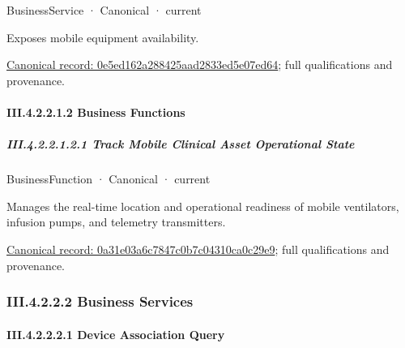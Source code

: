 \label{element:0e5ed162a288425aad2833ed5e07ed64}
{\small BusinessService · Canonical · current}\par

Exposes mobile equipment availability.


{\footnotesize \href{../../../../../../../continuum/business/business-service/0e5ed162a288425aad2833ed5e07ed64.md}{Canonical record: 0e5ed162a288425aad2833ed5e07ed64}; full qualifications and provenance.}\par
\paragraph*{III.4.2.2.1.2 Business Functions}
\label{navigation:III.4.2.2.1.2}

\subparagraph*{III.4.2.2.1.2.1 Track Mobile Clinical Asset Operational State}
\label{navigation:III.4.2.2.1.2.1}

\label{element:0a31e03a6c7847c0b7c04310ca0c29e9}
{\small BusinessFunction · Canonical · current}\par

Manages the real-time location and operational readiness of mobile ventilators, infusion pumps, and telemetry transmitters.


{\footnotesize \href{../../../../../../../continuum/business/business-function/0a31e03a6c7847c0b7c04310ca0c29e9.md}{Canonical record: 0a31e03a6c7847c0b7c04310ca0c29e9}; full qualifications and provenance.}\par
\subsubsection*{III.4.2.2.2 Business Services}
\label{navigation:III.4.2.2.2}

\paragraph*{III.4.2.2.2.1 Device Association Query}
\label{navigation:III.4.2.2.2.1}

